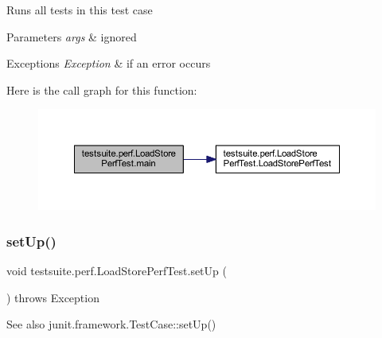 Runs all tests in this test case


\begin{DoxyParams}{Parameters}
{\em args} & ignored\\
\hline
\end{DoxyParams}

\begin{DoxyExceptions}{Exceptions}
{\em Exception} & if an error occurs \\
\hline
\end{DoxyExceptions}
Here is the call graph for this function\+:
\nopagebreak
\begin{figure}[H]
\begin{center}
\leavevmode
\includegraphics[width=350pt]{classtestsuite_1_1perf_1_1_load_store_perf_test_ab6e6a7c9d6a4facf8b8df79d201d8837_cgraph}
\end{center}
\end{figure}
\mbox{\label{classtestsuite_1_1perf_1_1_load_store_perf_test_a2c23eb5745202ad5793e966752a87ab7}} 
\subsubsection{\texorpdfstring{set\+Up()}{setUp()}}
{\footnotesize\ttfamily void testsuite.\+perf.\+Load\+Store\+Perf\+Test.\+set\+Up (\begin{DoxyParamCaption}{ }\end{DoxyParamCaption}) throws Exception}

\begin{DoxySeeAlso}{See also}
junit.\+framework.\+Test\+Case\+::set\+Up() 
\end{DoxySeeAlso}
\mbox{\label{classtestsuite_1_1perf_1_1_load_store_perf_test_a8c9cc35a3ee0fc42720dc2090ec300b5}} 
